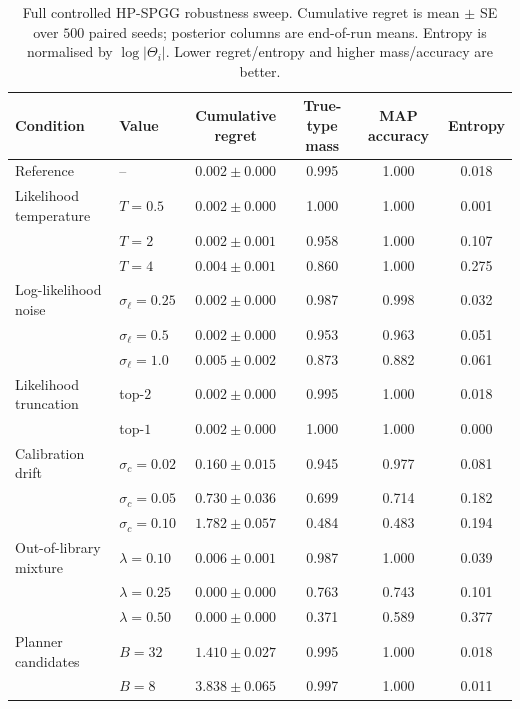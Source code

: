 \begin{table}[h]
\centering\small
\caption{Full controlled HP-SPGG robustness sweep. Cumulative regret is mean $\pm$ SE over $500$ paired seeds; posterior columns are end-of-run means. Entropy is normalised by $\log|\Theta_i|$. Lower regret/entropy and higher mass/accuracy are better.}
\label{tab:deployment-robustness-full}
\begin{tabular}{llcccc}
\toprule
Condition & Value & Cumulative regret & True-type mass & MAP accuracy & Entropy \\
\midrule
Reference & -- & $0.002\pm0.000$ & 0.995 & 1.000 & 0.018 \\
Likelihood temperature & $T{=}0.5$ & $0.002\pm0.000$ & 1.000 & 1.000 & 0.001 \\
 & $T{=}2$ & $0.002\pm0.001$ & 0.958 & 1.000 & 0.107 \\
 & $T{=}4$ & $0.004\pm0.001$ & 0.860 & 1.000 & 0.275 \\
Log-likelihood noise & $\sigma_\ell{=}0.25$ & $0.002\pm0.000$ & 0.987 & 0.998 & 0.032 \\
 & $\sigma_\ell{=}0.5$ & $0.002\pm0.000$ & 0.953 & 0.963 & 0.051 \\
 & $\sigma_\ell{=}1.0$ & $0.005\pm0.002$ & 0.873 & 0.882 & 0.061 \\
Likelihood truncation & top-$2$ & $0.002\pm0.000$ & 0.995 & 1.000 & 0.018 \\
 & top-$1$ & $0.002\pm0.000$ & 1.000 & 1.000 & 0.000 \\
Calibration drift & $\sigma_c{=}0.02$ & $0.160\pm0.015$ & 0.945 & 0.977 & 0.081 \\
 & $\sigma_c{=}0.05$ & $0.730\pm0.036$ & 0.699 & 0.714 & 0.182 \\
 & $\sigma_c{=}0.10$ & $1.782\pm0.057$ & 0.484 & 0.483 & 0.194 \\
Out-of-library mixture & $\lambda{=}0.10$ & $0.006\pm0.001$ & 0.987 & 1.000 & 0.039 \\
 & $\lambda{=}0.25$ & $0.000\pm0.000$ & 0.763 & 0.743 & 0.101 \\
 & $\lambda{=}0.50$ & $0.000\pm0.000$ & 0.371 & 0.589 & 0.377 \\
Planner candidates & $B{=}32$ & $1.410\pm0.027$ & 0.995 & 1.000 & 0.018 \\
 & $B{=}8$ & $3.838\pm0.065$ & 0.997 & 1.000 & 0.011 \\
\bottomrule
\end{tabular}
\end{table}

